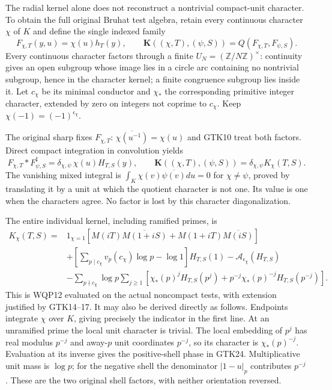 The radial kernel alone does not reconstruct a nontrivial
compact-unit character. To obtain the full original Bruhat
test algebra, retain every continuous character $\chi$ of
$K$ and define the single indexed family
\begin{equation}\tag{GTK22}
 F_{\chi,T}(y,u)=\chi(u)h_T(y),\qquad
 \mathbf K((\chi,T),(\psi,S))=Q(F_{\chi,T},F_{\psi,S}).
\end{equation}
Every continuous character factors through a finite
$U_N=(\mathbb Z/N\mathbb Z)^\times$: continuity gives an
open subgroup whose image lies in a circle arc containing
no nontrivial subgroup, hence in the character kernel;
a finite congruence subgroup lies inside it.
Let $c_\chi$ be its minimal conductor and $\chi_*$ the
corresponding primitive integer character, extended by
zero on integers not coprime to $c_\chi$. Keep
$\chi(-1)=(-1)^{\epsilon_\chi}$.

The original sharp fixes $F_{\chi,T}$:
$\overline{\chi(u^{-1})}=\chi(u)$ and GTK10 treat both
factors. Direct compact integration in convolution yields
\begin{equation}\tag{GTK23}
 F_{\chi,T}*F_{\psi,S}^{\sharp}
   =\delta_{\chi,\psi}\,\chi(u)H_{T,S}(y),\qquad
 \mathbf K((\chi,T),(\psi,S))
   =\delta_{\chi,\psi}K_\chi(T,S).
\end{equation}
The vanishing mixed integral is
$\int_K\chi(v)\overline{\psi(v)}du=0$ for $\chi\ne\psi$,
proved by translating it by a unit at which the quotient
character is not one. Its value is one when the characters
agree. No factor is lost by this character diagonalization.

The entire individual kernel, including ramified primes, is
\begin{equation}\tag{GTK24}
 \begin{split}
 K_\chi(T,S)={}&1_{\chi=1}
 [M(iT)\overline{M(1+iS)}
       +M(1+iT)\overline{M(iS)}]\\
 &+\left[\sum_{p\mid c_\chi}v_p(c_\chi)\log p-\log1\right]
                         H_{T,S}(1)-\mathcal A_{\epsilon_\chi}(H_{T,S})\\
 &-\sum_{p\nmid c_\chi}\log p\sum_{j\ge1}
   [\chi_*(p)^jH_{T,S}(p^j)
       +p^{-j}\chi_*(p)^{-j}H_{T,S}(p^{-j})].
 \end{split}
\end{equation}
This is WQP12 evaluated on the actual noncompact tests,
with extension justified by GTK14--17. It may also be
derived directly as follows. Endpoints integrate $\chi$
over $K$, giving precisely the indicator in the first
line. At an unramified prime the local unit character is
trivial. The local embedding of $p^j$ has real modulus
$p^{-j}$ and away-$p$ unit coordinates $p^{-j}$, so its
character is $\chi_*(p)^{-j}$. Evaluation at its inverse
gives the positive-shell phase in GTK24. Multiplicative
unit mass is $\log p$; for the negative shell the
denominator $|1-u|_p$ contributes $p^{-j}$.
These are the two original shell factors, with neither
orientation reversed.

